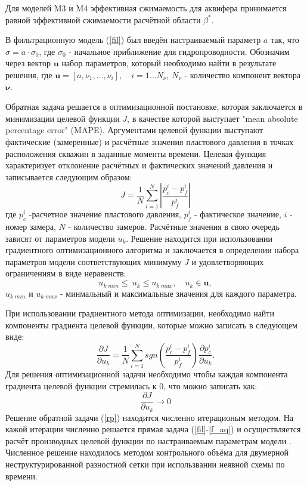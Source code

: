\documentclass{article}
\begin{document}
Для моделей M3 и M4 эффективная сжимаемость для аквифера принимается равной эффективной сжимаемости расчётной области $\beta^*$.

В фильтрационную модель (\ref{fil}) был введён настраиваемый параметр $a$ так, что $\sigma = a\cdot\sigma_0$, где $\sigma_0$ - начальное приближение для гидропроводности. Обозначим через вектор $\boldsymbol{u}$ набор параметров, который необходимо найти в результате решения, где $\boldsymbol{u} = [a, \nu_{1},...,\nu_{i}],\quad i = 1...N_{\nu}$, $N_{\nu}$ - количество компонент вектора $\boldsymbol{\nu}$.

Обратная задача решается в оптимизационной постановке, которая заключается в минимизации целевой функции $J$, в качестве которой выступает "mean absolute percentage error" (MAPE). Аргументами целевой функции выступают фактические (замеренные) и расчётные значения пластового давления в точках расположения скважин в заданные моменты времени. Целевая функция характеризует отклонение расчётных и фактических значений давления и записывается следующим образом:
\begin{equation} \label{mape}
J=\frac{1}{N}\sum_{i=1}^N{\left\vert\frac{p_c^i-p_f^i}{p_f^i}\right\vert}
\end{equation}
где $p_c^i$ -расчетное значение пластового давления, $p_f^i$ - фактическое значение, $i$ - номер замера, $N$ - количество замеров. Расчётные значения в свою очередь зависят от параметров модели $u_k$. Решение находится при использовании градиентного оптимизационного алгоритма и заключается в определении набора параметров модели соответствующих минимуму $J$ и удовлетворяющих ограничениям в виде неравенств:
\begin{equation*}
u_{k\;min}\leq\ u_k\leq u_{k\;max}, \quad u_k \in \boldsymbol{u},
\end{equation*}
$u_{k\;min}$ и $u_{k\;max}$ - минмальный и максимальные значения для каждого параметра.

При использовании градиентного метода оптимизации, необходимо найти компоненты градиента целевой функции, которые можно записать в следующем виде:
\begin{equation}
\frac{\partial J}{\partial u_k} = \frac{1}{N}\sum_{i=1}^N sgn\left(\frac{p_c^i-p_f^i}{p_f^i}\right)\frac{\partial p_c^i}{\partial u_k}.
\end{equation}
Для решения оптимизационной задачи необходимо чтобы каждая компонента градиента целевой функции стремилась к 0, что можно записать как:
\begin{equation} \label{rp}
	 \frac{\partial J}{\partial u_k} \rightarrow 0
\end{equation}
Решение обратной задачи (\ref{rp}) находится численно итерационым методом. На кажой итерации численно решается прямая задача (\ref{fil}-\ref{f_aq}) и осуществляется расчёт производных целевой функции по настраиваемым параметрам модели \cite{opt}. Численное решение находилось методом контрольного объёма  для двумерной неструктурированной разностной сетки при использвании неявной схемы по времени.
\end{document}
